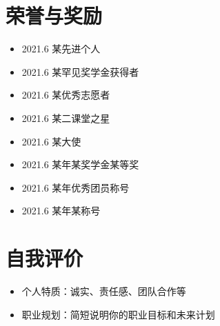 \documentclass[10pt]{article}
\begin{document}
    \section{\makebox[\widthof{\faStar}][c]{\color{CQMU_Green}{\faStar}}\quad 荣誉与奖励}
    \vspace{-1em}
    \begin{multicols}{2}
        \begin{itemize}
            \item 2021.6 \hspace{2em} 某先进个人 
            \item 2021.6 \hspace{2em} 某罕见奖学金获得者 
            \item 2021.6 \hspace{2em} 某优秀志愿者
            \item 2021.6 \hspace{2em} 某二课堂之星
            \item 2021.6 \hspace{2em} 某大使
            \item 2021.6 \hspace{2em} 某年某奖学金某等奖
            \item 2021.6 \hspace{2em} 某年优秀团员称号
            \item 2021.6 \hspace{2em} 某年某称号
        \end{itemize}
    \end{multicols}

    \section{\makebox[\widthof{\faStreetView}][c]{\color{CQMU_Green}{\faStreetView}}\quad 自我评价}
    \vspace{0.5em}
    \begin{itemize}
        \item 个人特质：诚实、责任感、团队合作等
        \item 职业规划：简短说明你的职业目标和未来计划
    \end{itemize}

\newpage
    
\end{document}
